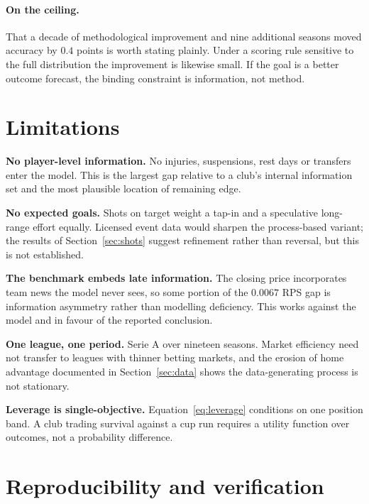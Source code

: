 \documentclass[11pt]{article}
\begin{document}
\paragraph{On the ceiling.} That a decade of methodological improvement and
nine additional seasons moved accuracy by $0.4$ points is worth stating
plainly. Under a scoring rule sensitive to the full distribution the
improvement is likewise small. If the goal is a better outcome forecast, the
binding constraint is information, not method.

\section{Limitations}
\label{sec:limits}

\textbf{No player-level information.} No injuries, suspensions, rest days or
transfers enter the model. This is the largest gap relative to a club's internal
information set and the most plausible location of remaining edge.

\textbf{No expected goals.} Shots on target weight a tap-in and a speculative
long-range effort equally. Licensed event data would sharpen the process-based
variant; the results of Section~\ref{sec:shots} suggest refinement rather than
reversal, but this is not established.

\textbf{The benchmark embeds late information.} The closing price incorporates
team news the model never sees, so some portion of the $0.0067$ RPS gap is
information asymmetry rather than modelling deficiency. This works against the
model and in favour of the reported conclusion.

\textbf{One league, one period.} Serie A over nineteen seasons. Market
efficiency need not transfer to leagues with thinner betting markets, and the
erosion of home advantage documented in Section~\ref{sec:data} shows the
data-generating process is not stationary.

\textbf{Leverage is single-objective.} Equation~\eqref{eq:leverage} conditions
on one position band. A club trading survival against a cup run requires a
utility function over outcomes, not a probability difference.

\section{Reproducibility and verification}
\label{sec:repro}
\end{document}
